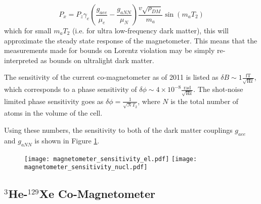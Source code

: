 \documentclass[aps,prd,final,letterpaper]{revtex4}
\begin{document}
\begin{equation}
P_x = P_z\gamma_e \left(\frac{g_{aee}}{\mu_e} - \frac{g_{aNN}}{\mu_N}\right)\frac{v\sqrt{\rho_{DM}}}{m_a}\sin{(m_a T_2)}
\end{equation}
which for small $m_a T_2$ (i.e. for ultra low-frequency dark matter), this will approximate the steady state response of the magnetometer. This means that the measurements made for bounds on Lorentz violation may be simply re-interpreted as bounds on ultralight dark matter. 

The sensitivity of the current co-magnetometer as of 2011 is listed as $\delta B \sim 1 \frac{\mathrm{fT}}{\sqrt{\mathrm{Hz}}}$, which corresponds to a phase sensitivity of $\delta \phi \sim 4\times 10^{-8} \frac{\mathrm{rad}}{\sqrt{\mathrm{Hz}}}$. The shot-noise limited phase sensitivity goes as $\delta \phi = \frac{1}{\sqrt{N}{T_2}}$, where $N$ is the total number of atoms in the volume of the cell. 

Using these numbers, the sensitivity to both of the dark matter couplings $g_{aee}$ and $g_{aNN}$ is shown in Figure \ref{fig:mag_sensitivity}.


\begin{figure}
\texttt{[image: magnetometer\_sensitivity\_el.pdf]}
\texttt{[image: magnetometer\_sensitivity\_nucl.pdf]}
\label{fig:mag_sensitivity}
\end{figure}


\subsection{$^{3}$He-$^{129}$Xe Co-Magnetometer}

\begingroup
\renewcommand{\section}[2]{}%
\begin{thebibliography}{100}


\end{thebibliography}
\end{document}
